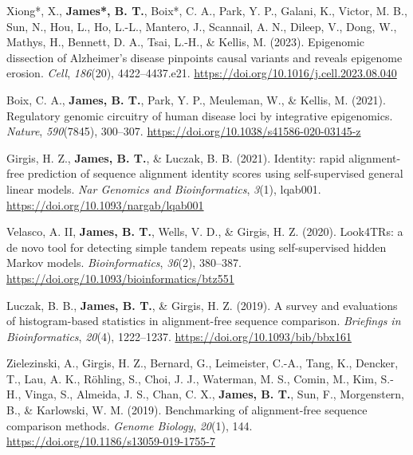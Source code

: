 \documentclass[letter,11pt]{article}
\begin{document}
		\item[\textbf{[J.11]}]{Xiong*, X., \textbf{James*, B. T.}, Boix*, C. A., Park, Y. P., Galani, K., Victor, M. B., Sun, N., Hou, L., Ho, L.-L., Mantero, J., Scannail, A. N., Dileep, V., Dong, W., Mathys, H., Bennett, D. A., Tsai, L.-H., \& Kellis, M. (2023). Epigenomic dissection of Alzheimer’s disease pinpoints causal variants and reveals epigenome erosion. \textit{Cell}, \textit{186}(20), 4422–4437.e21. \url{https://doi.org/10.1016/j.cell.2023.08.040}}

		\item[\textbf{[J.12]}]{Boix, C. A., \textbf{James, B. T.}, Park, Y. P., Meuleman, W., \& Kellis, M. (2021). Regulatory genomic circuitry of human disease loci by integrative epigenomics. \textit{Nature}, \textit{590}(7845), 300–307. \url{https://doi.org/10.1038/s41586-020-03145-z}}

		\item[\textbf{[J.13]}]{Girgis, H. Z., \textbf{James, B. T.}, \& Luczak, B. B. (2021). Identity: rapid alignment-free prediction of sequence alignment identity scores using self-supervised general linear models. \textit{Nar Genomics and Bioinformatics}, \textit{3}(1), lqab001. \url{https://doi.org/10.1093/nargab/lqab001}}

		\item[\textbf{[J.14]}]{Velasco, A. II, \textbf{James, B. T.}, Wells, V. D., \& Girgis, H. Z. (2020). Look4TRs: a de novo tool for detecting simple tandem repeats using self-supervised hidden Markov models. \textit{Bioinformatics}, \textit{36}(2), 380–387. \url{https://doi.org/10.1093/bioinformatics/btz551}}

		\item[\textbf{[J.15]}]{Luczak, B. B., \textbf{James, B. T.}, \& Girgis, H. Z. (2019). A survey and evaluations of histogram-based statistics in alignment-free sequence comparison. \textit{Briefings in Bioinformatics}, \textit{20}(4), 1222–1237. \url{https://doi.org/10.1093/bib/bbx161}}

		\item[\textbf{[J.16]}]{Zielezinski, A., Girgis, H. Z., Bernard, G., Leimeister, C.-A., Tang, K., Dencker, T., Lau, A. K., Röhling, S., Choi, J. J., Waterman, M. S., Comin, M., Kim, S.-H., Vinga, S., Almeida, J. S., Chan, C. X., \textbf{James, B. T.}, Sun, F., Morgenstern, B., \& Karlowski, W. M. (2019). Benchmarking of alignment-free sequence comparison methods. \textit{Genome Biology}, \textit{20}(1), 144. \url{https://doi.org/10.1186/s13059-019-1755-7}}
\end{document}
